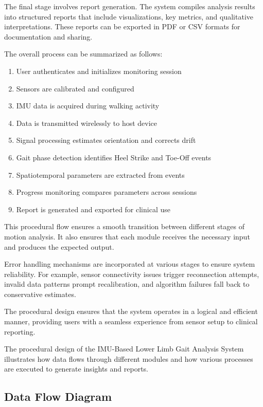 \documentclass[12pt,a4paper]{report}
\begin{document}
The final stage involves report generation. The system compiles analysis results into structured reports that include visualizations, key metrics, and qualitative interpretations. These reports can be exported in PDF or CSV formats for documentation and sharing.

The overall process can be summarized as follows:

\begin{enumerate}
    \item User authenticates and initializes monitoring session
    \item Sensors are calibrated and configured
    \item IMU data is acquired during walking activity
    \item Data is transmitted wirelessly to host device
    \item Signal processing estimates orientation and corrects drift
    \item Gait phase detection identifies Heel Strike and Toe-Off events
    \item Spatiotemporal parameters are extracted from events
    \item Progress monitoring compares parameters across sessions
    \item Report is generated and exported for clinical use
\end{enumerate}

This procedural flow ensures a smooth transition between different stages of motion analysis. It also ensures that each module receives the necessary input and produces the expected output.

Error handling mechanisms are incorporated at various stages to ensure system reliability. For example, sensor connectivity issues trigger reconnection attempts, invalid data patterns prompt recalibration, and algorithm failures fall back to conservative estimates.

The procedural design ensures that the system operates in a logical and efficient manner, providing users with a seamless experience from sensor setup to clinical reporting.

The procedural design of the IMU-Based Lower Limb Gait Analysis System illustrates how data flows through different modules and how various processes are executed to generate insights and reports.
\newpage
\subsection*{Data Flow Diagram}
\end{document}
